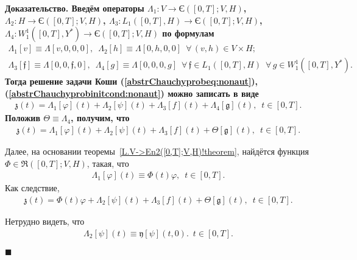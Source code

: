 \documentclass{report}
\newcounter{rem}[section]
\newcounter{theor}[section]
\newenvironment{Proof}{\par\noindent\bf Доказательство.\rm}{ $\blacksquare$\par}
\begin{document}
\begin{Proof}
Введём операторы $\Lambda_1:V\to \textrm{Є}([0,T];V,H)$, $\Lambda_2:H\to\textrm{Є}([0,T];V,H)$, $\Lambda_3:L_1([0,T],H)\to \textrm{Є}([0,T];V,H)$, $\Lambda_4:W^1_1([0,T], Y^*)\to\textrm{Є}([0,T];V,H)$  по формулам
\begin{gather*}
\Lambda_1[v]\equiv\Lambda[v,0,0,0],\,\,\,\Lambda_2[h]\equiv\Lambda[0,h,0,0]\,\,\,\forall\,(v,h)\in V\times H;\\
\Lambda_3[\mathfrak{f}]\equiv\Lambda[0,0,\mathfrak{f},0],\,\,\,\Lambda_4[g]\equiv\Lambda[0,0,0,g]\,\,\,\forall\,\mathfrak{f}\in L_1([0,T],H)\,\,\,\forall\,g\in W^1_1([0,T], Y^*).
\end{gather*}
Тогда решение задачи Коши (\ref{abstrChauchyprobeq:nonaut}), (\ref{abstrChauchyprobinitcond:nonaut}) можно записать в виде
\begin{gather*}
\mathfrak{z}(t)=\Lambda_1[\varphi](t)+\Lambda_2[\psi](t)+\Lambda_3[f](t)+\Lambda_4[\mathfrak{g}](t),\,\,\,t\in[0,T].
\end{gather*}
Положив $\Theta\equiv\Lambda_4$, получим, что
\begin{gather*}
\mathfrak{z}(t)=\Lambda_1[\varphi](t)+\Lambda_2[\psi](t)+\Lambda_3[f](t)+\Theta[\mathfrak{g}](t),\,\,\,t\in[0,T].
\end{gather*}

Далее, на основании теоремы~\ref{L.V->En2([0,T];V,H)!theorem}, найдётся функция $\Phi\in\mathfrak{R}([0,T]; V,H)$, такая, что
\begin{gather*}
\Lambda_1[\varphi](t)\equiv\Phi(t)\varphi,\,\,\,t\in[0,T].
\end{gather*}
Как следствие,
\begin{gather}\label{z.repres!Phi.Theta}
\mathfrak{z}(t)=\Phi(t)\varphi+\Lambda_2[\psi](t)+\Lambda_3[f](t)+\Theta[\mathfrak{g}](t),\,\,\,t\in[0,T].
\end{gather}

Нетрудно видеть, что
\begin{gather}\label{Lambda.2.repres}
\Lambda_2[\psi](t)\equiv\mathfrak{y}[\psi](t,0).\,\,\,t\in[0,T].
\end{gather}


\end{Proof}
\end{document}
